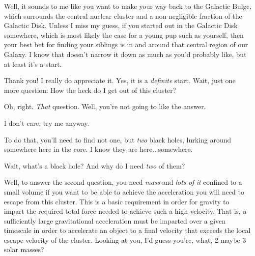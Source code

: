 \documentclass[main.tex]{subfiles}
\begin{document}
\par \Enrico Well, it sounds to me like you want to make your way back to the Galactic Bulge, which surrounds the central nuclear cluster and a non-negligible fraction of the Galactic Disk.  Unless I miss my guess, if you started out in the Galactic Disk somewhere, which is most likely the case for a young pup such as yourself, then your best bet for finding your siblings is in and around that central region of our Galaxy.  I know that doesn't narrow it down as much as you'd probably like, but at least it's a start.

\par \Sterope Thank you!  I really do appreciate it.  Yes, it is a \textit{definite} start.  Wait, just one more question:  How the heck do I get out of this cluster?

\par \Enrico Oh, right.  \textit{That} question.  Well, you're not going to like the answer.

\par \Sterope I don't care, try me anyway.

\par \Enrico To do that, you'll need to find not one, but \textit{two} black holes, lurking around somewhere here in the core.  I know they are here...somewhere.  

\par \Sterope Wait, what's a black hole?  And why do I need \textit{two} of them?

\par \Enrico Well, to answer the second question, you need \textit{mass} and \textit{lots of it} confined to a small volume if you want to be able to achieve the acceleration you will need to escape from this cluster.  This is a basic requirement in order for gravity to impart the required total force needed to achieve such a high velocity.  That is, a sufficiently large gravitational acceleration must be imparted over a given timescale in order to accelerate an object to a final velocity that exceeds the local escape velocity of the cluster.  Looking at you, I'd guess you're, what, 2 maybe 3 solar masses?
\end{document}
